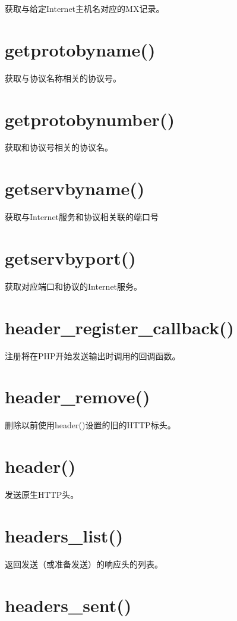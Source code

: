 获取与给定Internet主机名对应的MX记录。

\section{getprotobyname()}

获取与协议名称相关的协议号。

\section{getprotobynumber()}

获取和协议号相关的协议名。

\section{getservbyname()}

获取与Internet服务和协议相关联的端口号

\section{getservbyport()}

获取对应端口和协议的Internet服务。

\section{header\_register\_callback()}

注册将在PHP开始发送输出时调用的回调函数。

\section{header\_remove()}

删除以前使用header()设置的旧的HTTP标头。


\section{header()}

发送原生HTTP头。

\section{headers\_list()}

返回发送（或准备发送）的响应头的列表。

\section{headers\_sent()}

